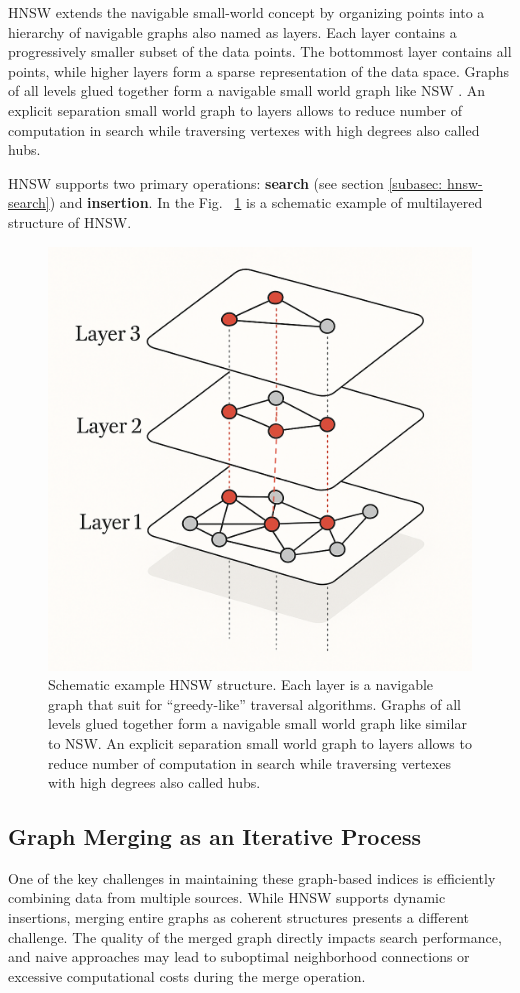 \documentclass{article}
\begin{document}
HNSW \cite{hnsw} extends the navigable small-world concept by organizing points into a hierarchy of navigable graphs also named as layers. Each layer contains a progressively smaller subset of the data points. The bottommost layer contains all points, while higher layers form a sparse representation of the data space. 
Graphs of all levels glued together form a navigable small world graph like NSW \cite{nsw2011}. An explicit separation small world graph to layers allows to reduce number of computation in search while traversing vertexes with high degrees also called hubs. 

HNSW supports two primary operations: \textbf{search} (see section \ref{subasec: hnsw-search}) and  \textbf{insertion}. In the Fig. ~\ref{fig:hnsw} is a schematic example of multilayered structure of HNSW.

\begin{figure}
  \centering
  \includegraphics[width=0.5\linewidth]{figs/hnsw-gpt.png}
  \caption{Schematic example HNSW structure. Each layer is a navigable graph that suit for ``greedy-like'' traversal algorithms. Graphs of all levels glued together form a navigable small world graph like similar to NSW. An explicit separation small world graph to layers allows to reduce number of computation in search while traversing vertexes with high degrees also called hubs.}
\label{fig:hnsw}
\end{figure}


\subsection{Graph Merging as an Iterative Process}
One of the key challenges in maintaining these graph-based indices is efficiently combining data from multiple sources. While HNSW supports dynamic insertions, merging entire graphs as coherent structures presents a different challenge. The quality of the merged graph directly impacts search performance, and naive approaches may lead to suboptimal neighborhood connections or excessive computational costs during the merge operation.
\end{document}
